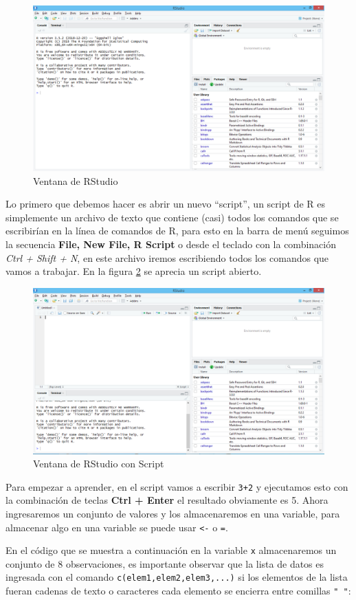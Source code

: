 \documentclass[]{book}
\begin{document}
\begin{figure}[h!]

{\centering \includegraphics[width=0.5\linewidth]{rstudio1} 

}

\caption{Ventana de RStudio}\label{fig:rstudio1}
\end{figure}

Lo primero que debemos hacer es abrir un nuevo ``script'', un script de R es simplemente un archivo de texto que contiene (casi) todos los comandos que se escribirían en la línea de comandos de R, para esto en la barra de menú seguimos la secuencia \textbf{File, New File, R Script} o desde el teclado con la combinación \emph{Ctrl + Shift + N}, en este archivo iremos escribiendo todos los comandos que vamos a trabajar. En la figura \ref{fig:rstudio2} se aprecia un script abierto.

\begin{figure}[h!]

{\centering \includegraphics[width=0.5\linewidth]{rstudio2} 

}

\caption{Ventana de RStudio con Script}\label{fig:rstudio2}
\end{figure}

Para empezar a aprender, en el script vamos a escribir \texttt{3+2} y ejecutamos esto con la combinación de teclas \textbf{Ctrl + Enter} el resultado obviamente es 5. Ahora ingresaremos un conjunto de valores y los almacenaremos en una variable, para almacenar algo en una variable se puede usar \texttt{\textless{}-} o \texttt{=}.

En el código que se muestra a continuación en la variable \texttt{x} almacenaremos un conjunto de 8 observaciones, es importante observar que la lista de datos es ingresada con el comando \texttt{c(elem1,elem2,elem3,...)} si los elementos de la lista fueran cadenas de texto o caracteres cada elemento se encierra entre comillas \texttt{"\ "}:
\end{document}
